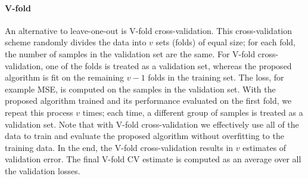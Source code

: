 \documentclass[12pt, krantz2,]{krantz}
\newenvironment{Shaded}{\begin{snugshade}}{\end{snugshade}}
\newcommand{\CommentTok}[1]{\textcolor[rgb]{0.37,0.37,0.37}{\textit{#1}}}
\newcommand{\DecValTok}[1]{\textcolor[rgb]{0.06,0.06,0.06}{#1}}
\newcommand{\KeywordTok}[1]{\textcolor[rgb]{0.27,0.27,0.27}{\textbf{#1}}}
\newcommand{\NormalTok}[1]{#1}
\newcommand{\StringTok}[1]{\textcolor[rgb]{0.5,0.5,0.5}{#1}}
\let\oldparagraph\paragraph
\renewcommand{\paragraph}[1]{\oldparagraph{#1}\mbox{}}
\theoremstyle{definition}
\theoremstyle{definition}
\theoremstyle{definition}
\newcommand{\1}{\mathbbm{1}}
\begin{document}
\begin{Shaded}
\end{Shaded}

\hypertarget{v-fold}{%
\paragraph{V-fold}\label{v-fold}}

An alternative to leave-one-out is V-fold cross-validation. This
cross-validation scheme randomly divides the data into \(v\) sets (folds) of equal
size; for each fold, the number of samples in the validation set are the same.
For V-fold cross-validation, one of the folds is treated as a validation set,
whereas the proposed algorithm is fit on the remaining \(v-1\) folds in the
training set. The loss, for example MSE, is computed on the samples in the
validation set. With the proposed algorithm trained and its performance
evaluated on the first fold, we repeat this process \(v\) times; each time, a
different group of samples is treated as a validation set. Note that with V-fold
cross-validation we effectively use all of the data to train and evaluate the
proposed algorithm without overfitting to the training data. In the end, the
V-fold cross-validation results in \(v\) estimates of validation error. The final
V-fold CV estimate is computed as an average over all the validation losses.
\end{document}

